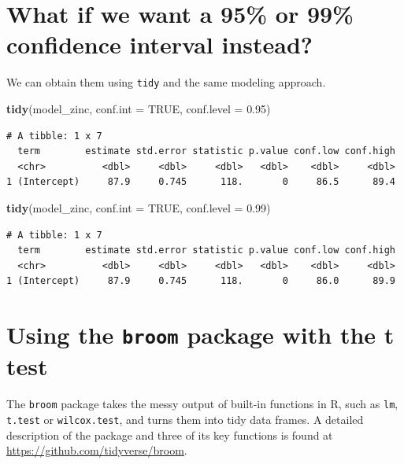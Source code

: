 \documentclass[
]{book}
\newenvironment{Shaded}{\begin{snugshade}}{\end{snugshade}}
\newcommand{\DataTypeTok}[1]{\textcolor[rgb]{0.13,0.29,0.53}{#1}}
\newcommand{\FloatTok}[1]{\textcolor[rgb]{0.00,0.00,0.81}{#1}}
\newcommand{\KeywordTok}[1]{\textcolor[rgb]{0.13,0.29,0.53}{\textbf{#1}}}
\newcommand{\NormalTok}[1]{#1}
\newcommand{\OtherTok}[1]{\textcolor[rgb]{0.56,0.35,0.01}{#1}}
\begin{document}
\hypertarget{what-if-we-want-a-95-or-99-confidence-interval-instead}{%
\section{What if we want a 95\% or 99\% confidence interval instead?}\label{what-if-we-want-a-95-or-99-confidence-interval-instead}}

We can obtain them using \texttt{tidy} and the same modeling approach.

\begin{Shaded}
\begin{Highlighting}[]
\KeywordTok{tidy}\NormalTok{(model_zinc, }\DataTypeTok{conf.int =} \OtherTok{TRUE}\NormalTok{, }\DataTypeTok{conf.level =} \FloatTok{0.95}\NormalTok{)}
\end{Highlighting}
\end{Shaded}

\begin{verbatim}
# A tibble: 1 x 7
  term        estimate std.error statistic p.value conf.low conf.high
  <chr>          <dbl>     <dbl>     <dbl>   <dbl>    <dbl>     <dbl>
1 (Intercept)     87.9     0.745      118.       0     86.5      89.4
\end{verbatim}

\begin{Shaded}
\begin{Highlighting}[]
\KeywordTok{tidy}\NormalTok{(model_zinc, }\DataTypeTok{conf.int =} \OtherTok{TRUE}\NormalTok{, }\DataTypeTok{conf.level =} \FloatTok{0.99}\NormalTok{)}
\end{Highlighting}
\end{Shaded}

\begin{verbatim}
# A tibble: 1 x 7
  term        estimate std.error statistic p.value conf.low conf.high
  <chr>          <dbl>     <dbl>     <dbl>   <dbl>    <dbl>     <dbl>
1 (Intercept)     87.9     0.745      118.       0     86.0      89.9
\end{verbatim}

\hypertarget{using-the-broom-package-with-the-t-test}{%
\section{\texorpdfstring{Using the \texttt{broom} package with the t test}{Using the broom package with the t test}}\label{using-the-broom-package-with-the-t-test}}

The \texttt{broom} package takes the messy output of built-in functions in R, such as \texttt{lm}, \texttt{t.test} or \texttt{wilcox.test}, and turns them into tidy data frames. A detailed description of the package and three of its key functions is found at \url{https://github.com/tidyverse/broom}.
\end{document}
